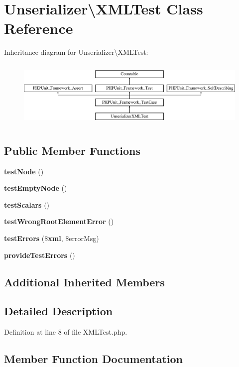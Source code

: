 \section{Unserializer\textbackslash{}X\+M\+L\+Test Class Reference}
\label{class_php_parser_1_1_unserializer_1_1_x_m_l_test}
Inheritance diagram for Unserializer\textbackslash{}X\+M\+L\+Test\+:\begin{figure}[H]
\begin{center}
\leavevmode
\includegraphics[height=3.303835cm]{class_php_parser_1_1_unserializer_1_1_x_m_l_test}
\end{center}
\end{figure}
\subsection*{Public Member Functions}
\begin{DoxyCompactItemize}
\item 
{\bf test\+Node} ()
\item 
{\bf test\+Empty\+Node} ()
\item 
{\bf test\+Scalars} ()
\item 
{\bf test\+Wrong\+Root\+Element\+Error} ()
\item 
{\bf test\+Errors} (\${\bf xml}, \$error\+Msg)
\item 
{\bf provide\+Test\+Errors} ()
\end{DoxyCompactItemize}
\subsection*{Additional Inherited Members}


\subsection{Detailed Description}


Definition at line 8 of file X\+M\+L\+Test.\+php.



\subsection{Member Function Documentation}
